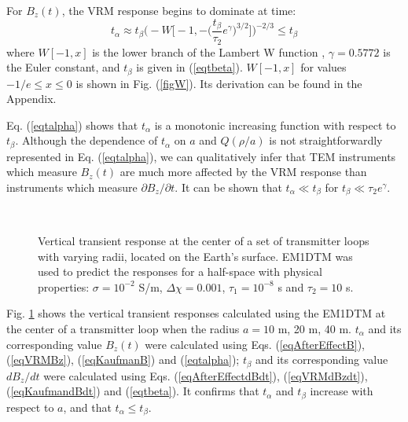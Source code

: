 \documentclass[journal]{IEEEtran}  %
\begin{document}
For $B_z(t)$, the VRM response begins to dominate at time:
\begin{equation}
\label{eqtalpha}
t_\alpha \approx  t_\beta \Bigg ( - W \Bigg [ - \! 1, - \Big ( \frac{t_\beta}{\tau_2} e^\gamma \Big )^{3/2} \Bigg ] \Bigg )^{-2/3} \leq t_\beta
\end{equation}
where $W[-1,x]$ is the lower branch of the  Lambert W function
\cite{Corless1996}, $\gamma = 0.5772$ is the Euler constant, and
$t_\beta$ is given in (\ref{eqtbeta}). $W[-1,x]$ for values $-1/e
\leq x \leq 0$ is shown in Fig. (\ref{figW}). Its derivation can be
found in the Appendix.

Eq. (\ref{eqtalpha}) shows that $t_\alpha$ is a monotonic increasing
function with respect to $t_\beta$. Although the dependence of $t_\alpha$ 
on $a$ and $Q(\rho/a)$ is not straightforwardly represented in Eq. (\ref{eqtalpha}), 
we can qualitatively infer that TEM instruments which measure $B_z(t)$ are 
much more affected by the VRM response than instruments which measure $\partial
B_z/\partial t$. It can be shown that $t_\alpha \ll t_\beta$ for
$t_\beta \ll \tau_2 e^\gamma$.
%
\begin{figure}[!b]
    \centering
    \vspace{-15pt}
    \\
    \vspace{-10pt}
    \caption{Vertical transient response at the center of a set of transmitter loops
    with varying radii, located on the Earth's surface.
    EM1DTM was used to predict the responses for a half-space
    with physical properties: $\sigma=10^{-2}$ S/m, $\Delta \chi=0.001$, $\tau_1=10^{-8}$ s and $\tau_2=10$ s.}
    \label{figEMandVRMrespLoops}
\end{figure}
%
Fig. \ref{figEMandVRMrespLoops} shows the vertical transient
responses calculated using the EM1DTM at the center of a transmitter
loop when the radius $a = 10$ m, 20 m, 40 m. $t_{\alpha}$ and its
corresponding value $B_z(t)$ were calculated using Eqs.
(\ref{eqAfterEffectB}), (\ref{eqVRMBz}), (\ref{eqKaufmanB}) and
(\ref{eqtalpha}); $t_{\beta}$ and its corresponding value $dB_z/dt$
were calculated using Eqs. (\ref{eqAfterEffectdBdt}),
(\ref{eqVRMdBzdt}), (\ref{eqKaufmandBdt}) and (\ref{eqtbeta}). It
confirms that $t_\alpha$ and $t_\beta$ increase with respect to $a$,
and that $t_\alpha \leq t_\beta$. 
\end{document}
